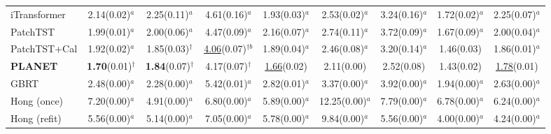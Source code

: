 \begin{table}[!t]
\begin{adjustbox}{max width=\linewidth}
\begin{tabular}{lcccccccc}
iTransformer & 2.14{\scriptsize\color{gray}(0.02)}$^{a}$ & 2.25{\scriptsize\color{gray}(0.11)}$^{a}$ & 4.61{\scriptsize\color{gray}(0.16)}$^{a}$ & 1.93{\scriptsize\color{gray}(0.03)}$^{a}$ & 2.53{\scriptsize\color{gray}(0.02)}$^{a}$ & 3.24{\scriptsize\color{gray}(0.16)}$^{a}$ & 1.72{\scriptsize\color{gray}(0.02)}$^{a}$ & 2.25{\scriptsize\color{gray}(0.07)}$^{a}$ \\
PatchTST & 1.99{\scriptsize\color{gray}(0.01)}$^{a}$ & 2.00{\scriptsize\color{gray}(0.06)}$^{a}$ & 4.47{\scriptsize\color{gray}(0.09)}$^{a}$ & 2.16{\scriptsize\color{gray}(0.07)}$^{a}$ & 2.74{\scriptsize\color{gray}(0.11)}$^{a}$ & 3.72{\scriptsize\color{gray}(0.09)}$^{a}$ & 1.67{\scriptsize\color{gray}(0.09)}$^{a}$ & 2.00{\scriptsize\color{gray}(0.04)}$^{a}$ \\
PatchTST+Cal & 1.92{\scriptsize\color{gray}(0.02)}$^{a}$ & 1.85{\scriptsize\color{gray}(0.03)}$^{\dagger{}}$ & \underline{4.06}{\scriptsize\color{gray}(0.07)}$^{\dagger{}b}$ & 1.89{\scriptsize\color{gray}(0.04)}$^{a}$ & 2.46{\scriptsize\color{gray}(0.08)}$^{a}$ & 3.20{\scriptsize\color{gray}(0.14)}$^{a}$ & 1.46{\scriptsize\color{gray}(0.03)} & 1.86{\scriptsize\color{gray}(0.01)}$^{a}$ \\
\textbf{PLANET} & \textbf{1.70}{\scriptsize\color{gray}(0.01)}$^{\dagger{}}$ & \textbf{1.84}{\scriptsize\color{gray}(0.07)}$^{\dagger{}}$ & 4.17{\scriptsize\color{gray}(0.07)}$^{\dagger{}}$ & \underline{1.66}{\scriptsize\color{gray}(0.02)} & 2.11{\scriptsize\color{gray}(0.00)} & 2.52{\scriptsize\color{gray}(0.08)} & 1.43{\scriptsize\color{gray}(0.02)} & \underline{1.78}{\scriptsize\color{gray}(0.01)} \\
GBRT & 2.48{\scriptsize\color{gray}(0.00)}$^{a}$ & 2.28{\scriptsize\color{gray}(0.00)}$^{a}$ & 5.42{\scriptsize\color{gray}(0.01)}$^{a}$ & 2.82{\scriptsize\color{gray}(0.01)}$^{a}$ & 3.37{\scriptsize\color{gray}(0.00)}$^{a}$ & 3.92{\scriptsize\color{gray}(0.00)}$^{a}$ & 1.94{\scriptsize\color{gray}(0.00)}$^{a}$ & 2.63{\scriptsize\color{gray}(0.00)}$^{a}$ \\
Hong (once) & 7.20{\scriptsize\color{gray}(0.00)}$^{a}$ & 4.91{\scriptsize\color{gray}(0.00)}$^{a}$ & 6.80{\scriptsize\color{gray}(0.00)}$^{a}$ & 5.89{\scriptsize\color{gray}(0.00)}$^{a}$ & 12.25{\scriptsize\color{gray}(0.00)}$^{a}$ & 7.79{\scriptsize\color{gray}(0.00)}$^{a}$ & 6.78{\scriptsize\color{gray}(0.00)}$^{a}$ & 6.24{\scriptsize\color{gray}(0.00)}$^{a}$ \\
Hong (refit) & 5.56{\scriptsize\color{gray}(0.00)}$^{a}$ & 5.14{\scriptsize\color{gray}(0.00)}$^{a}$ & 7.05{\scriptsize\color{gray}(0.00)}$^{a}$ & 5.78{\scriptsize\color{gray}(0.00)}$^{a}$ & 9.84{\scriptsize\color{gray}(0.00)}$^{a}$ & 5.56{\scriptsize\color{gray}(0.00)}$^{a}$ & 4.00{\scriptsize\color{gray}(0.00)}$^{a}$ & 4.24{\scriptsize\color{gray}(0.00)}$^{a}$ \\

\end{tabular}
\end{adjustbox}
\end{table}
